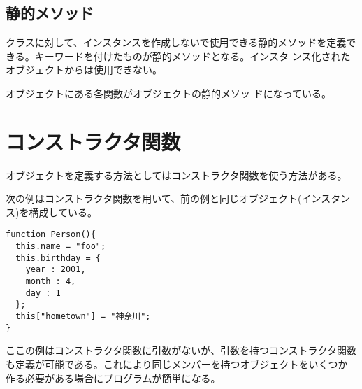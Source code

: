 \subsection{静的メソッド}
クラスに対して、インスタンスを作成しないで使用できる静的メソッドを定義で
きる。キーワードを付けたものが静的メソッドとなる。インスタ
ンス化されたオブジェクトからは使用できない。

オブジェクトにある各関数がオブジェクトの静的メソッ
ドになっている。
\iffalse
\section{コンストラクタ関数}
オブジェクトを定義する方法としてはコンストラクタ関数を使う方法がある。
\begin{Exec}\label{constructor}\upshape
次の例はコンストラクタ関数を用いて、前の例と同じオブジェクト(インスタン
 ス)を構成している。
\begin{Verbatim}
function Person(){
  this.name = "foo";
  this.birthday = {
    year : 2001,
    month : 4,
    day : 1
  };
  this["hometown"] = "神奈川";
}
\end{Verbatim}
\end{Exec}
ここの例はコンストラクタ関数に引数がないが、引数を持つコンストラクタ関数
 も定義が可能である。これにより同じメンバーを持つオブジェクトをいくつか
 作る必要がある場合にプログラムが簡単になる。

